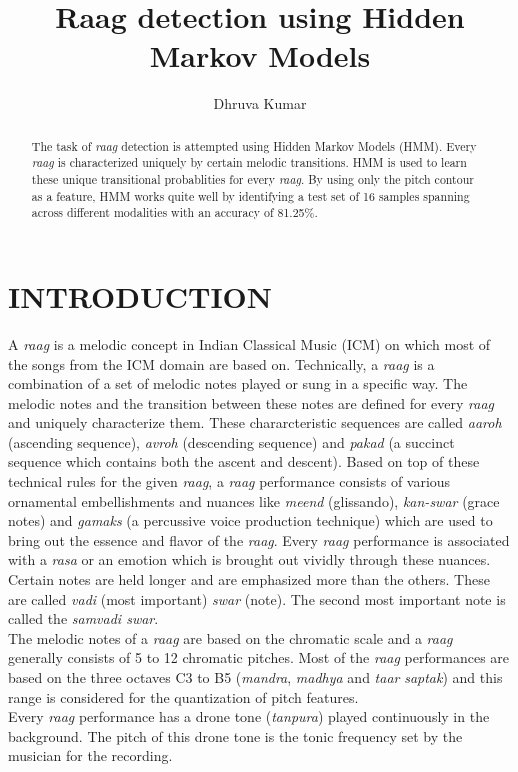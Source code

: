 \documentclass[letterpaper, 10 pt, conference]{ieeeconf}  %
\title{\LARGE \bf
Raag detection using Hidden Markov Models
}
\author{Dhruva Kumar}%
\begin{document}
\maketitle
\thispagestyle{empty}
\pagestyle{empty}


\begin{abstract}

The task of \textit{raag} detection is attempted using Hidden Markov Models (HMM). Every \textit{raag} is characterized uniquely by certain melodic transitions. HMM is used to learn these unique transitional probablities for every \textit{raag}. By using only the pitch contour as a feature, HMM works quite well by identifying a test set of 16 samples spanning across different modalities with an accuracy of 81.25\%.

\end{abstract}


\section{INTRODUCTION}

A \textit{raag} is a melodic concept in Indian Classical Music (ICM) on which most of the songs from the ICM domain are based on. Technically, a \textit{raag} is a combination of a set of melodic notes played or sung in a specific way. The melodic notes and the transition between these notes are defined for every \textit{raag} and uniquely characterize them. These chararcteristic sequences are called \textit{aaroh} (ascending sequence), \textit{avroh} (descending sequence) and \textit{pakad} (a succinct sequence which contains both the ascent and descent). Based on top of these technical rules for the given \textit{raag}, a \textit{raag} performance consists of various ornamental embellishments and nuances like \textit{meend} (glissando), \textit{kan-swar} (grace notes) and \textit{gamaks} (a percussive voice production technique) which are used to bring out the essence and flavor of the \textit{raag}. Every \textit{raag} performance is associated with a \textit{rasa} or an emotion which is brought out vividly through these nuances. 
Certain notes are held longer and are emphasized more than the others. These are called \textit{vadi} (most important) \textit{swar} (note). The second most important note is called the \textit{samvadi swar}. \\
The melodic notes of a \textit{raag} are based on the chromatic scale and a \textit{raag} generally consists of 5 to 12 chromatic pitches. Most of the \textit{raag} performances are based on the three octaves C3 to B5 (\textit{mandra}, \textit{madhya} and \textit{taar} \textit{saptak}) and this range is considered for the quantization of pitch features. \\
Every \textit{raag} performance has a drone tone (\textit{tanpura}) played continuously in the background. The pitch of this drone tone is the tonic frequency set by the musician for the recording. \\
\end{document}
